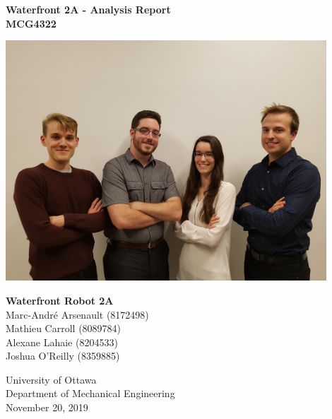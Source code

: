 
\begin{titlepage}
    \begin{center}
        \textbf{Waterfront 2A - Analysis Report}\\
        \textbf{MCG4322}
        
        \vfill
        
        \includegraphics[width=12cm]{team_picture.jpg}
        
        \vfill
        
        \textbf{Waterfront Robot 2A}\\
        Marc-André Arsenault (8172498)\\
        Mathieu Carroll (8089784)\\
        Alexane Lahaie (8204533)\\
        Joshua O'Reilly (8359885)\\
  
        \vfill
  
        University of Ottawa\\
        Department of Mechanical Engineering\\
        November 20, 2019
  
    \end{center}
 \end{titlepage}